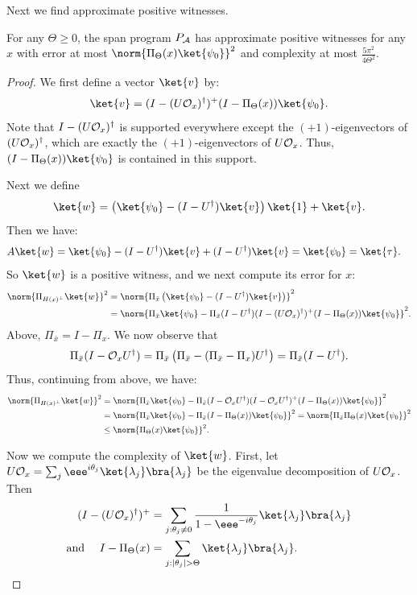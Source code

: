 \documentclass{toc}
\begin{document}
Next we find approximate positive witnesses. 

\begin{lemma}\label{lem:monotone-alg-pos}
For any $\Theta\geq 0$, the span program $P_{\cal A}$ has approximate positive witnesses for any $x$ with error at most $\norm{\Pi_\Theta(x)\ket{\psi_0}}^2$ and complexity at most $\frac{5\pi^2}{4\Theta^2}$. 
\end{lemma}
\begin{proof}
We first define a vector $\ket{v}$ by:
$$\ket{v} = (I-(U{\cal O}_x)^\dagger)^+(I-\Pi_\Theta(x))\ket{\psi_0}.$$
Note that $I-(U{\cal O}_x)^\dagger$ is supported everywhere except the $(+1)$-eigenvectors of $(U{\cal O}_x)^\dagger$, which are exactly the $(+1)$-eigenvectors of $U{\cal O}_x$. Thus, $(I-\Pi_\Theta(x))\ket{\psi_0}$ is contained in this support. 

Next we define
$$\ket{w}=\left(\ket{\psi_0}-(I-U^\dagger)\ket{v}\right)\ket{1}+\ket{v}.$$
Then we have:
\begin{align*}
A\ket{w} &= \ket{\psi_0} - (I-U^\dagger)\ket{v} + (I-U^\dagger)\ket{v} = \ket{\psi_0}=\ket{\tau}.
\end{align*}
So $\ket{w}$ is a positive witness, and we next compute its error for $x$:
\begin{align*}
\norm{\Pi_{H(x)^\bot}\ket{w}}^2 &= \norm{\Pi_{\bar x}\left(\ket{\psi_0} - (I-U^\dagger)\ket{v}\right)}^2\\
&= \norm{\Pi_{\bar x}\ket{\psi_0} - \Pi_{\bar x}(I-U^\dagger)(I-(U{\cal O}_x)^{\dagger})^+(I-\Pi_\Theta(x))\ket{\psi_0}}^2.
\end{align*}
Above, $\Pi_{\bar{x}}=I-\Pi_x$. We now observe that
$$\Pi_{\bar{x}}(I-{\cal O}_xU^\dagger)=\Pi_{\bar x}\left(\Pi_{\bar{x}} - (\Pi_{\bar{x}}-\Pi_x)U^\dagger\right)=\Pi_{\bar x}(I-U^\dagger).$$
Thus, continuing from above, we have:
\begin{align*}
\norm{\Pi_{H(x)^\bot}\ket{w}}^2&= \norm{\Pi_{\bar x}\ket{\psi_0} - \Pi_{\bar x}(I-{\cal O}_xU^\dagger)(I-{\cal O}_xU^\dagger)^+(I-\Pi_\Theta(x))\ket{\psi_0}}^2\\
&= \norm{\Pi_{\bar x}\ket{\psi_0} - \Pi_{\bar x}(I-\Pi_\Theta(x))\ket{\psi_0}}^2
= \norm{\Pi_{\bar x}\Pi_\Theta(x)\ket{\psi_0}}^2\\
&\leq \norm{\Pi_{\Theta}(x)\ket{\psi_0}}^2.
\end{align*}


Now we compute the complexity of $\ket{w}$. First, let $U{\cal O}_x=\sum_j \eee^{i\theta_j}\ket{\lambda_j}\bra{\lambda_j}$ be the eigenvalue decomposition of $U{\cal O}_x$. Then 
\begin{align*}
(I-(U{\cal O}_x)^\dagger)^+ &= \sum_{j:\theta_j\neq 0} \frac{1}{1-\eee^{-i\theta_j}}\ket{\lambda_j}\bra{\lambda_j}\\
\mbox{and }\quad I-\Pi_{\Theta}(x) &=\sum_{j:|\theta_j|>\Theta}\ket{\lambda_j}\bra{\lambda_j}.
\end{align*}


\end{proof}
\end{document}
